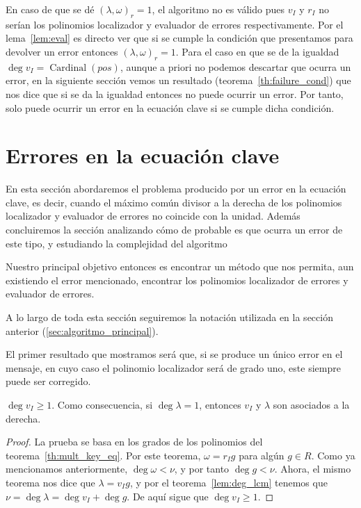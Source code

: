 En caso de que se dé \({(\lambda, \omega)}_r = 1\), el algoritmo no es válido pues \(v_I\) y  \(r_I\) no serían los polinomios localizador y evaluador de errores respectivamente. Por el lema~\ref{lem:eval} es directo ver que si se cumple la condición que presentamos para devolver un error entonces \({(\lambda, \omega)}_r = 1\). Para el caso en que se de la igualdad \(\deg v_I = \operatorname{Cardinal}(pos)\), aunque a priori no podemos descartar que ocurra un error, en la siguiente sección vemos un resultado (teorema~\ref{th:failure_cond}) que nos dice que si se da la igualdad entonces no puede ocurrir un error. Por tanto, solo puede ocurrir un error en la ecuación clave si se cumple dicha condición.

\section{Errores en la ecuación clave}%
\label{sec:errores_en_ecuación_clave}

En esta sección abordaremos el problema producido por un error en la ecuación clave, es decir, cuando el máximo común divisor a la derecha de los polinomios localizador y evaluador de errores no coincide con la unidad. Además concluiremos la sección analizando cómo de probable es que ocurra un error de este tipo, y estudiando la complejidad del algoritmo

Nuestro principal objetivo entonces es encontrar un método que nos permita, aun existiendo el error mencionado, encontrar los polinomios localizador de errores y evaluador de errores.

A lo largo de toda esta sección seguiremos la notación utilizada en la sección anterior (\ref{sec:algoritmo_principal}).

El primer resultado que mostramos será que, si se produce un único error en el mensaje, en cuyo caso el polinomio localizador será de grado uno, este siempre puede ser corregido.

\begin{lemma}
    \(\deg v_I \ge 1\). Como consecuencia, si \(\deg \lambda = 1\), entonces  \(v_I\) y  \(\lambda\) son asociados a la derecha.
\end{lemma}

\begin{proof}
    La prueba se basa en los grados de los polinomios del teorema~\ref{th:mult_key_eq}. Por este teorema, \(\omega = r_I g\) para algún \(g \in R\). Como ya mencionamos anteriormente, \(\deg \omega < \nu\), y por tanto \(\deg g < \nu\). Ahora, el mismo teorema nos dice que \(\lambda = v_I g\), y por el teorema~\ref{lem:deg_lcm} tenemos que \(\nu = \deg \lambda = \deg v_{I} + \deg g\). De aquí sigue que \(\deg v_I \ge 1\).
\end{proof}

